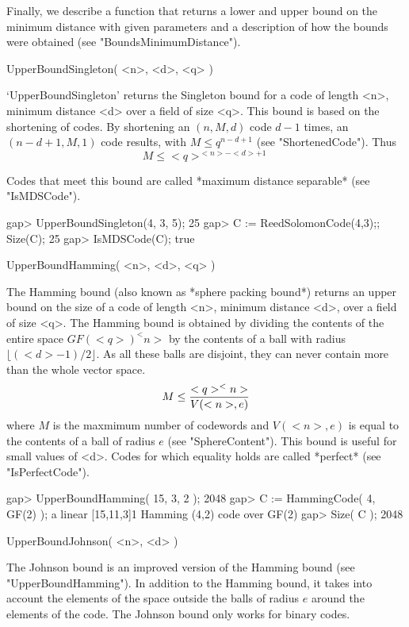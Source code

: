 Finally, we describe a function that returns a lower and upper  bound  on
the minimum distance with given parameters and a description of  how  the
bounds were obtained (see "BoundsMinimumDistance").

\>UpperBoundSingleton( <n>, <d>, <q> )

`UpperBoundSingleton' returns the  Singleton bound for  a code of  length
<n>, minimum distance <d> over  a field of size  <q>. This bound is based
on  the  shortening of codes.  By  shortening an $(n,  M, d)$  code $d-1$
times,  an $(n-d+1,M,1)$   code results, with   $M  \leq  q^{n-d+1}$ (see
"ShortenedCode"). Thus
$$M \leq <q>^{<n>-<d>+1}$$

Codes that  meet this bound  are called *maximum distance separable* (see
"IsMDSCode").

\beginexample
gap> UpperBoundSingleton(4, 3, 5);
25
gap> C := ReedSolomonCode(4,3);; Size(C);
25
gap> IsMDSCode(C);
true 
\endexample

\>UpperBoundHamming( <n>, <d>, <q> )

The Hamming bound (also known as *sphere packing bound*) returns an upper
bound on the size of a code  of length <n>, minimum  distance <d>, over a
field of size <q>. The Hamming bound is obtained by dividing the contents
of the entire space $GF(<q>) ^<n>$ by the contents  of a ball with radius
$\lfloor(<d>-1) / 2\rfloor$.  As all  these balls are disjoint, they  can
never contain more than the whole vector  space.  $$M \leq {<q>^<n> \over
V(<n>,e)}$$ where $M$ is the maxmimum number  of codewords and $V(<n>,e)$
is   equal  to   the   contents   of   a  ball     of radius  $e$    (see
"SphereContent").  This bound is  useful for small  values of <d>.  Codes
for which equality holds are called *perfect* (see "IsPerfectCode").

\beginexample
gap> UpperBoundHamming( 15, 3, 2 );
2048
gap> C := HammingCode( 4, GF(2) );
a linear [15,11,3]1 Hamming (4,2) code over GF(2)
gap> Size( C );
2048 
\endexample

\>UpperBoundJohnson( <n>, <d> )

The Johnson bound  is  an improved   version  of the Hamming  bound  (see
"UpperBoundHamming").   In addition to the   Hamming bound, it takes into
account the elements of the space outside the  balls of radius $e$ around
the elements of the code. The Johnson bound only works for binary codes.

